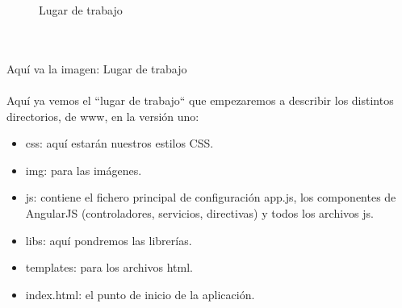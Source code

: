 \documentclass[a4paper, 11pt]{article}
\begin{document}
\begin{itemize}
             \begin{figure}[H]
               \centering
                    \caption{Lugar de trabajo}
                    \label{f:estructuraTrabajo}
              \end{figure}

            \\\\\textcolor[rgb]{1,0,0}{Aquí va la imagen: Lugar de trabajo}\\\\

            Aquí ya vemos el ``lugar de trabajo`` que empezaremos a describir los
            distintos directorios, de www, en la versión uno:

            \begin{itemize}
                  \item{css: aquí estarán nuestros estilos CSS.}
                  \item{img: para las imágenes.}
                  \item{js: contiene el fichero principal de configuración app.js,
                        los componentes de AngularJS (controladores, servicios,
                        directivas) y todos los archivos js.}
                  \item{libs: aquí pondremos las librerías.}
                  \item{templates: para los archivos html.}
                  \item{index.html: el punto de inicio de la aplicación.}
            \end{itemize}


\end{itemize}
\end{document}

